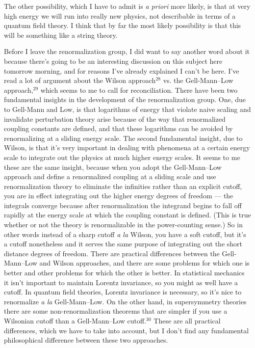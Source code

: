  The other possibility, which I have to admit is {\em a
priori} more likely, is that at very high energy we will run
into  really new physics, not describable in terms of a
quantum field theory.  I think that by far the most likely
possibility is that this will be something like a string
theory.

Before I leave the renormalization group, I did want to say
another word about it because there's going to be an
interesting discussion on this subject here tomorrow
morning, and for reasons I've already explained I can't be
here.  I've read  a lot of argument  about the Wilson
approach$^{28}$ vs. the
Gell-Mann--Low approach,$^{29}$ which seems to me to call
for
reconciliation.  There have been two fundamental insights in
the development of the renormalization group.  One, due to
Gell-Mann and Low, is that logarithms of energy that violate
naive scaling and invalidate perturbation theory arise
because of the way that renormalized coupling constants are
defined, and that these logarithms can be avoided by
renormalizing at a sliding energy scale.  The  second
fundamental insight, due to Wilson, is that it's very
important in dealing with phenomena at a certain energy
scale to integrate out the physics at much higher energy
scales.  It seems to me these are the same insight, because
when you adopt the Gell-Mann--Low approach and define a
renormalized coupling at a sliding scale and use
renormalization theory to eliminate the infinities rather
than an explicit cutoff, you are in effect integrating out
the higher energy degrees of freedom --- the integrals
converge because after renormalization the integrand begins
to fall off rapidly at the energy scale at which the
coupling constant is defined.  (This is true whether or not
the theory is renormalizable in the power-counting sense.)
So in other words instead of a sharp cutoff {\em a la}
Wilson, you have a soft cutoff, but it's a cutoff
nonetheless and it serves the same purpose of integrating
out the short distance degrees of freedom.    There are
practical differences between the Gell-Mann--Low and Wilson
approaches, and there are some problems for which one is
better and other problems for which the other is better.  In
statistical mechanics it isn't important to maintain Lorentz
invariance, so you might as well have a cutoff.  In  quantum
field theories, Lorentz invariance is necessary, so it's
nice to renormalize {\em a la} Gell-Mann--Low. On the other
hand, in supersymmetry theories there are some
non-renormalization theorems that are simpler if you use a
Wilsonian cutoff than a Gell-Mann--Low cutoff.$^{30}$  These
are
all practical differences, which we have to take into
account, but I don't find any fundamental philosophical
difference between these two approaches.


